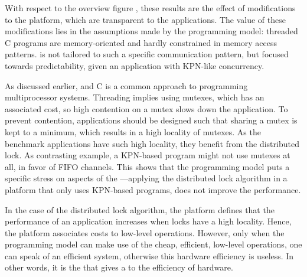 With respect to the overview figure \chapfigpageref, these results are the effect of modifications to the platform, which are transparent to the applications.
The value of these modifications lies in the assumptions made by the programming model: threaded C programs are memory-oriented and hardly constrained in memory access patterns.
\AEthereal is not tailored to such a specific communication pattern, but focused towards predictability, given an application with \ac{KPN}-like concurrency.

As discussed earlier,  and C is a common approach to programming multiprocessor systems.
Threading implies using mutexes, which has an associated cost, so high contention on a mutex slows down the application.
To prevent contention, applications should be designed such that sharing a mutex is kept to a minimum, which results in a high locality of mutexes.
As the benchmark applications have such high locality, they benefit from the distributed lock.
As contrasting example, a \ac{KPN}-based program might not use mutexes at all, in favor of \ac{FIFO} channels.
This shows that the programming model puts a specific stress on aspects of the ---applying the distributed lock algorithm in a platform that only uses \ac{KPN}-based programs, does not improve the performance.

In the case of the distributed lock algorithm, the platform defines that the performance of an application increases when locks have a high locality.
Hence, the platform associates costs to low-level operations.
However, only when the programming model can make use of the cheap, \ie efficient, low-level operations, one can speak of an efficient system, otherwise this hardware efficiency is useless.
In other words, it is the  that gives a  to the efficiency of hardware.

